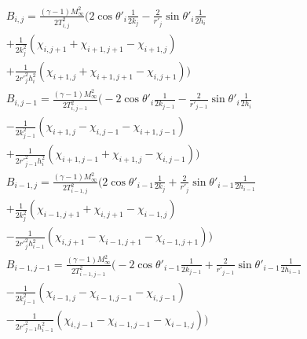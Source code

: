 \documentclass[a4paper]{report}
\begin{document}
	\begin{equation}
		\begin{split}
		B_{i,j} = \frac{(\gamma-1)M_\infty^2}{2T_{i,j}^2}
		\Biggl(
			2\cos \theta '_i \frac{1}{2k_j}
			- \frac{2}{r'_j} \sin\theta '_i \frac{1}{2h_i} \\
			+ \frac{1}{2k_j^2}( \chi_{i,j+1} + \chi_{i+1,j+1} - \chi_{i+1,j} ) \\
			+ \frac{1}{2r'^2_jh_i^2}( \chi_{i+1,j} + \chi_{i+1,j+1} - \chi_{i,j+1} )
		\Biggr) \\
		B_{i,j-1} = \frac{(\gamma-1)M_\infty^2}{2T_{i,j-1}^2}
		\Biggl(
			- 2\cos \theta '_i \frac{1}{2k_{j-1}}
			- \frac{2}{r'_{j-1}} \sin\theta '_i \frac{1}{2h_i} \\
			- \frac{1}{2k_{j-1}^2}( \chi_{i+1,j} - \chi_{i,j-1} - \chi_{i+1,j-1} ) \\
			+ \frac{1}{2r'^2_{j-1}h_i^2}( \chi_{i+1,j-1} + \chi_{i+1,j} - \chi_{i,j-1} )
		\Biggr) \\
		B_{i-1,j} = \frac{(\gamma-1)M_\infty^2}{2T_{i-1,j}^2}
		\Biggl(
			2\cos \theta '_{i-1} \frac{1}{2k_j}
			+ \frac{2}{r'_j} \sin\theta '_{i-1} \frac{1}{2h_{i-1}} \\
			+ \frac{1}{2k_j^2}( \chi_{i-1,j+1} + \chi_{i,j+1} - \chi_{i-1,j} ) \\
			- \frac{1}{2r'^2_jh_{i-1}^2}( \chi_{i,j+1} - \chi_{i-1,j+1} - \chi_{i-1,j+1} )
		\Biggr) \\
		B_{i-1,j-1} = \frac{(\gamma-1)M_\infty^2}{2T_{i-1,j-1}^2}
		\Biggl(
			- 2\cos \theta '_{i-1} \frac{1}{2k_{j-1}}
			+ \frac{2}{r'_{j-1}} \sin\theta '_{i-1} \frac{1}{2h_{i-1}} \\
			- \frac{1}{2k_{j-1}^2}( \chi_{i-1,j} - \chi_{i-1,j-1} - \chi_{i,j-1} ) \\
			- \frac{1}{2r'^2_{j-1}h_{i-1}^2}( \chi_{i,j-1} - \chi_{i-1,j-1} - \chi_{i-1,j} )
		\Biggr) \\
		\end{split}
	\end{equation}
	
\end{document}
